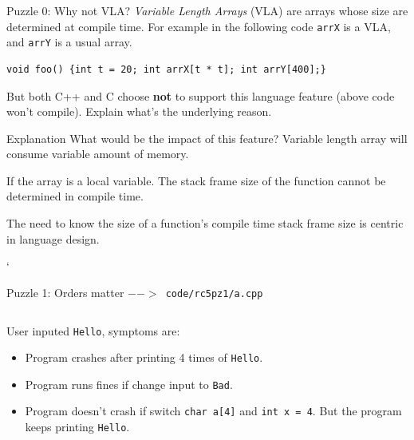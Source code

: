 \begin{frame}[fragile]{Puzzle 0: Why not VLA?}
\textit{Variable Length Arrays} (VLA) are arrays whose size are determined at compile time. For example in the following code \texttt{arrX} is a VLA, and \texttt{arrY} is a usual array.
\begin{verbatim}
void foo() {int t = 20; int arrX[t * t]; int arrY[400];}
\end{verbatim}
But both C++ and C choose \textbf{not} to support this language feature (above code won't compile). Explain what's the underlying reason.

\pause
\begin{block}{Explanation}
What would be the impact of this feature? Variable length array will consume variable amount of memory.

If the array is a local variable. The stack frame size of the function cannot be determined in compile time. 

The need to know the size of a function's compile time stack frame size is centric in language design. 
\end{block}      `
\end{frame}

\begin{frame}[fragile]{Puzzle 1: Orders matter}
\texttt{$-->$ code/rc5pz1/a.cpp}
\inputminted{c++}{code/rc5pz1/a.cpp}
User inputed \texttt{Hello}, symptoms are:
\begin{itemize}
	\item Program crashes after printing 4 times of \texttt{Hello}.
	\item Program runs fines if change input to \texttt{Bad}.
	\item Program doesn't crash if switch \texttt{char a[4]} and \texttt{int x = 4}. But the program keeps printing \texttt{Hello}.
\end{itemize}
\end{frame}

